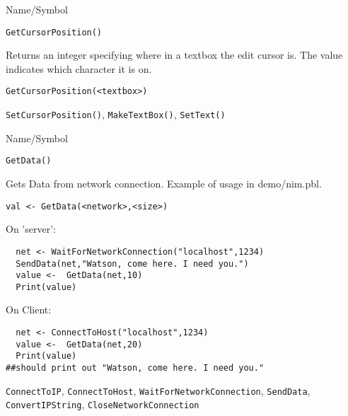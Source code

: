 \begin{desc}{Name/Symbol}
\item[Name/Symbol]	\verb+GetCursorPosition()+

\item[Description]	Returns an integer specifying where in a textbox the edit cursor is.  The value indicates which character it is on.

\item[Usage]
\begin{verbatim}
GetCursorPosition(<textbox>)
\end{verbatim}

\item[Example]	

\item[See Also]	\verb+SetCursorPosition()+, \verb+MakeTextBox()+, \verb+SetText()+
\end{desc}

\begin{desc}{Name/Symbol}
\item[Name/Symbol]	\verb+GetData()+

\item[Description]	Gets Data from network connection.  Example of
  usage in demo/nim.pbl.

\item[Usage]
\begin{verbatim}
val <- GetData(<network>,<size>)
\end{verbatim}

\item[Example]	

On 'server':
\begin{verbatim}
  net <- WaitForNetworkConnection("localhost",1234)
  SendData(net,"Watson, come here. I need you.")
  value <-  GetData(net,10)
  Print(value)

\end{verbatim}
On Client:
\begin{verbatim}
  net <- ConnectToHost("localhost",1234)
  value <-  GetData(net,20)
  Print(value)
##should print out "Watson, come here. I need you."
\end{verbatim}
\item[See Also]
  \verb+ConnectToIP+, \verb+ConnectToHost+, \verb+WaitForNetworkConnection+,
   \verb+SendData+, \verb+ConvertIPString+, \verb+CloseNetworkConnection+
\end{desc}





